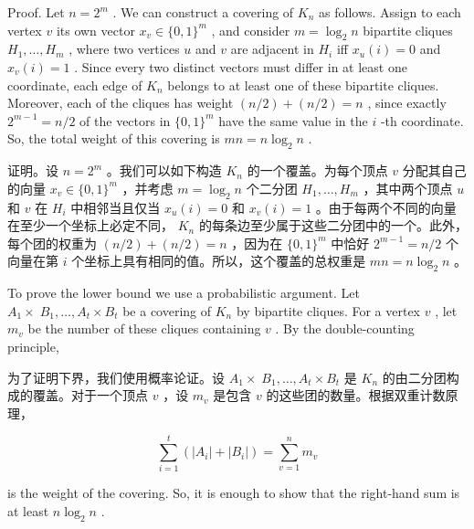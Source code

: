 \documentclass[10pt]{article}
\begin{document}
Proof. Let \(n = {2}^{m}\) . We can construct a covering of \({K}_{n}\) as follows. Assign to each vertex \(v\) its own vector \({x}_{v} \in  \{ 0,1{\} }^{m}\) , and consider \(m = {\log }_{2}n\) bipartite cliques \({H}_{1},\ldots ,{H}_{m}\) , where two vertices \(u\) and \(v\) are adjacent in \({H}_{i}\) iff \({x}_{u}\left( i\right)  = 0\) and \({x}_{v}\left( i\right)  = 1\) . Since every two distinct vectors must differ in at least one coordinate, each edge of \({K}_{n}\) belongs to at least one of these bipartite cliques. Moreover, each of the cliques has weight \(\left( {n/2}\right)  + \left( {n/2}\right)  = n\) , since exactly \({2}^{m - 1} = n/2\) of the vectors in \(\{ 0,1{\} }^{m}\) have the same value in the \(i\) -th coordinate. So, the total weight of this covering is \({mn} = n{\log }_{2}n\) .

\begin{tcolorbox}\relax
证明。设 \(n = {2}^{m}\) 。我们可以如下构造 \({K}_{n}\) 的一个覆盖。为每个顶点 \(v\) 分配其自己的向量 \({x}_{v} \in  \{ 0,1{\} }^{m}\) ，并考虑 \(m = {\log }_{2}n\) 个二分团 \({H}_{1},\ldots ,{H}_{m}\) ，其中两个顶点 \(u\) 和 \(v\) 在 \({H}_{i}\) 中相邻当且仅当 \({x}_{u}\left( i\right)  = 0\) 和 \({x}_{v}\left( i\right)  = 1\) 。由于每两个不同的向量在至少一个坐标上必定不同， \({K}_{n}\) 的每条边至少属于这些二分团中的一个。此外，每个团的权重为 \(\left( {n/2}\right)  + \left( {n/2}\right)  = n\) ，因为在 \(\{ 0,1{\} }^{m}\) 中恰好 \({2}^{m - 1} = n/2\) 个向量在第 \(i\) 个坐标上具有相同的值。所以，这个覆盖的总权重是 \({mn} = n{\log }_{2}n\) 。
\end{tcolorbox}

To prove the lower bound we use a probabilistic argument. Let \({A}_{1} \times \; {B}_{1},\ldots ,{A}_{t} \times  {B}_{t}\) be a covering of \({K}_{n}\) by bipartite cliques. For a vertex \(v\) , let \({m}_{v}\) be the number of these cliques containing \(v\) . By the double-counting principle,

\begin{tcolorbox}\relax
为了证明下界，我们使用概率论证。设 \({A}_{1} \times \; {B}_{1},\ldots ,{A}_{t} \times  {B}_{t}\) 是 \({K}_{n}\) 的由二分团构成的覆盖。对于一个顶点 \(v\) ，设 \({m}_{v}\) 是包含 \(v\) 的这些团的数量。根据双重计数原理，
\end{tcolorbox}

\[
\mathop{\sum }\limits_{{i = 1}}^{t}\left( {\left| {A}_{i}\right|  + \left| {B}_{i}\right| }\right)  = \mathop{\sum }\limits_{{v = 1}}^{n}{m}_{v}
\]

is the weight of the covering. So, it is enough to show that the right-hand sum is at least \(n{\log }_{2}n\) .
\end{document}
